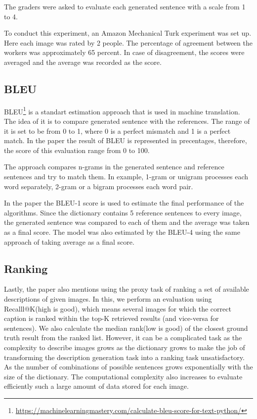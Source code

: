 \documentclass[a4paper,UKenglish,cleveref, autoref, thm-restate]{lipics-v2021}
\begin{document}
The graders were asked to evaluate each generated sentence with a scale from 1 to 4.

To conduct this experiment, an Amazon Mechanical Turk experiment was set up. Here each image was rated by 2 people. The percentage of agreement between the workers was approximately 65 percent. In case of disagreement, the scores were averaged and the average was recorded as the score.

\subsection{BLEU}
BLEU\footnote{\url{ https://machinelearningmastery.com/calculate-bleu-score-for-text-python/}} is a standart estimation approach that is used in machine translation. The idea of it is to compare generated sentence with the references. The range of it is set to be from 0 to 1, where 0 is a perfect mismatch and 1 is a perfect match. In the paper the result of BLEU is represented in precentages, therefore, the score of this evaluation range from 0 to 100.

The approach compares n-grams in the generated sentence and reference sentences and try to match them. In example, 1-gram or unigram processes each word separately, 2-gram or a bigram processes each word pair.

In the paper the BLEU-1 score is used to estimate the final performance of the algorithms. Since the dictionary contains 5 reference sentences to every image, the generated sentence was compared to each of them and the average was taken as a final score. The model was also estimated by the BLEU-4 using the same approach of taking average as a final score.
\subsection{Ranking}
Lastly, the paper also mentions using the proxy task of ranking a set of available descriptions of given images. In this, we perform an evaluation using Recalll@K(high is good), which means several images for which the correct caption is ranked within the top-K retrieved results (and vice-versa for sentences). We also calculate the median rank(low is good) of the closest ground truth result from the ranked list. However, it can be a complicated task as the complexity to describe images grows as the dictionary grows to make the job of transforming the description generation task into a ranking task unsatisfactory. As the number of combinations of possible sentences grows exponentially with the size of the dictionary. The computational complexity also increases to evaluate efficiently such a large amount of data stored for each image.
\end{document}
